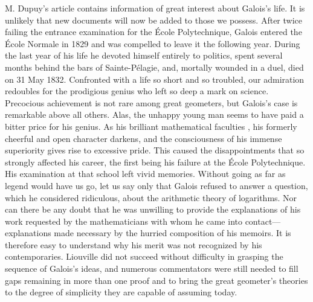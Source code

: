 M. Dupuy's article contains information of great interest about Galois's life.
It is unlikely that new documents will now be added to those we possess. After
twice failing the entrance examination for the École Polytechnique, Galois
entered the École Normale in 1829 and was compelled to leave it the following
year. During the last year of his life he devoted himself entirely to politics,
spent several months behind the bars of Sainte-Pélagie, and, mortally wounded
in a duel, died on 31 May 1832. Confronted with a life so short and so troubled,
our admiration redoubles for the prodigious genius who left so deep a mark on
science. Precocious achievement is not rare among great geometers, but Galois's
case is remarkable above all others. Alas, the unhappy young man seems to have
paid a bitter price for his genius. As his brilliant mathematical faculties
, his formerly cheerful and open character
darkens, and the consciousness of his immense superiority gives rise to
excessive pride. This caused the disappointments that so strongly affected his
career, the first being his failure at the École Polytechnique. His examination
at that%
%
school left vivid memories. Without going as far as legend would have us go,
let us say only that Galois refused to answer a question, which he considered
ridiculous, about the arithmetic theory of logarithms. Nor can there be any
doubt that he was unwilling to provide the explanations of his work requested
by the mathematicians with whom he came into contact---explanations made
necessary by the hurried composition of his memoirs. It is therefore easy to
understand why his merit was not recognized by his contemporaries. Liouville
did not succeed without difficulty in grasping the sequence of Galois's ideas,
and numerous commentators were still needed to fill gaps remaining in more
than one proof and to bring the great geometer's theories to the degree of
simplicity they are capable of assuming today.


